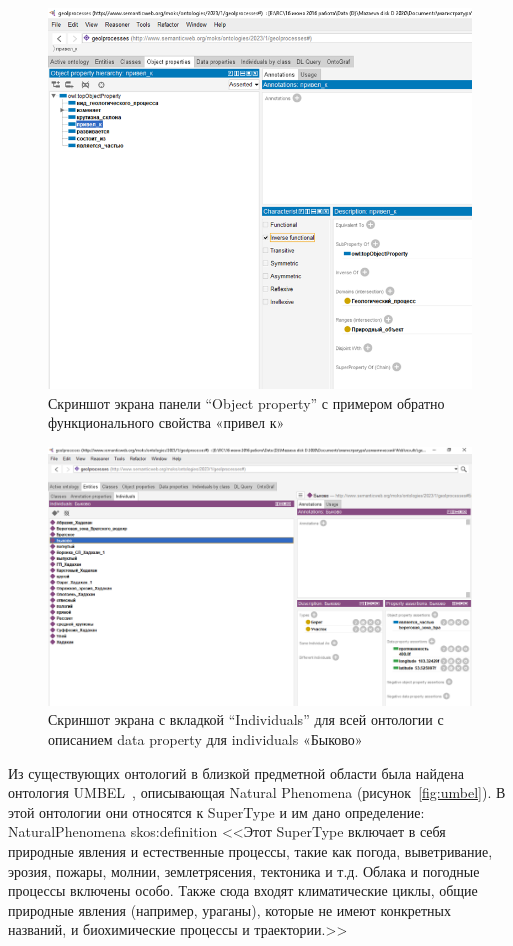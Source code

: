\documentclass[732,14pt,final]{studrep}
\begin{document}
  \begin{figure}[htp]
	\centering
	\includegraphics[width=0.9\linewidth]{pics/image7.png}
    \caption{Скриншот экрана панели “Object property” с примером обратно функционального свойства «привел к»}
    \label{fig:obj-prop-results}
  \end{figure}

  \begin{figure}[htp]
	\centering
	\includegraphics[width=0.9\linewidth]{pics/image5.png}
    \caption{Скриншот экрана с вкладкой “Individuals” для всей онтологии с описанием data property для individuals «Быково»}
    \label{fig:bykovo-instance}
  \end{figure}

Из существующих онтологий в близкой предметной области была найдена онтология UMBEL~\cite{umbel}, описывающая Natural Phenomena (рисунок~\ref{fig:umbel}). В этой онтологии они относятся к SuperType и им дано определение: NaturalPhenomena skos:definition <<Этот SuperType включает в себя природные явления и естественные процессы, такие как погода, выветривание, эрозия, пожары, молнии, землетрясения, тектоника и т.д. Облака и погодные процессы включены особо. Также сюда входят климатические циклы, общие природные явления (например, ураганы), которые не имеют конкретных названий, и биохимические процессы и траектории.>>
\end{document}
